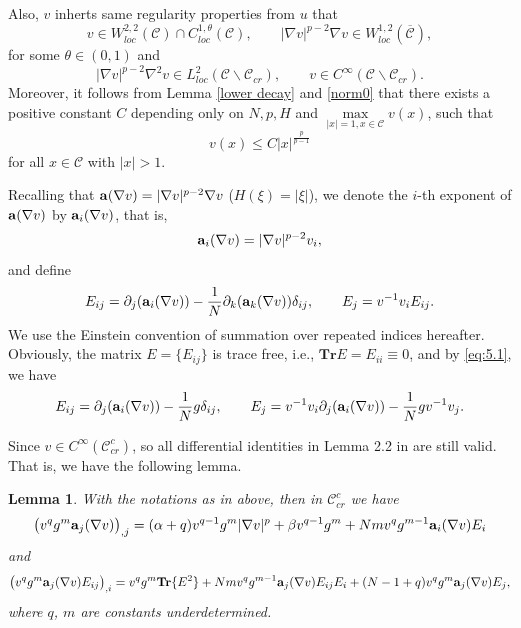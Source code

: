 \documentclass[12pt]{amsart}
\newtheorem{lem}[thm]{Lemma}
\theoremstyle{definition}
\theoremstyle{remark}
\theoremstyle{conclusion}
\theoremstyle{conjecture}
\numberwithin{equation}{section}
\begin{document}
Also, $v$ inherts same regularity properties from $u$ that
\begin{equation*}\label{eq:5.2}
  v\in W^{2,2}_{loc}(\mathcal{C})\cap C^{1,\theta}_{loc}(\mathcal{C}),\qquad|\nabla v|^{p-2}\nabla v\in W^{1,2}_{loc}(\overline{\mathcal{C}}),
\end{equation*}
for some $\theta\in(0,1)$ and
\begin{equation*}\label{eq:5.3}
 |\nabla v|^{p-2}\nabla^2v\in L^{2}_{loc}(\mathcal{C}\backslash\mathcal{C}_{cr}),\qquad v\in C^{\infty}(\mathcal{C}\backslash\mathcal{C}_{cr}).
\end{equation*}
Moreover, it follows from Lemma \ref{lower decay} and \eqref{norm0} that there exists a positive constant $C$ depending only on $N,p,H$ and  $\max\limits_{|x|=1,x\in\mathcal{C}}v(x)$, such that
\begin{equation}\label{eq5.4}
  v(x)\leq C|x|^{\frac{p}{p-1}}
\end{equation}
for all $x\in\mathcal{C}$ with $|x|>1$.


Recalling that ${\bf{a}}(\nabla v)=|\nabla v|^{p-2}\nabla v$ ($H(\xi)=|\xi|$),  we denote the $i$-th exponent of ${\bf{a}}(\nabla v)$ by ${\bf{a}}_i(\nabla v)$, that is,
$${\bf{a}}_i(\nabla v)=|\nabla v|^{p-2} v_i,$$
and define
$$E_{ij}=\partial_j({\bf{a}}_i(\nabla v))-\frac{1}{N}\partial_k({\bf{a}}_k(\nabla v))\delta_{ij},\qquad E_j=v^{-1}v_iE_{ij}.$$
We use the Einstein convention of summation over repeated indices hereafter. Obviously, the matrix $E=\{E_{ij}\}$ is trace free, i.e., $\textbf{Tr}E=E_{ii}\equiv 0$, and by \eqref{eq:5.1}, we have
$$E_{ij}=\partial_j({\bf{a}}_i(\nabla v))-\frac{1}{N}g\delta_{ij},\qquad E_j=v^{-1}v_i\partial_j({\bf{a}}_i(\nabla v))-\frac{1}{N}gv^{-1}v_j.$$

Since $v\in C^{\infty}(\mathcal{C}^c_{cr})$, so all differential identities in Lemma 2.2 in \cite{Ou} are still valid. That is, we have the following lemma.

\begin{lem}\cite[Lemma 2.2]{Ou}\label{lem5.2}
With the notations as in above, then in $\mathcal{C}^c_{cr}$ we have
\begin{equation}\label{eq5.6}
\big( v^{q}g^{m}{\bf{a}}_j(\nabla v)\big)_{,j}=(\alpha+q)v^{q-1}g^m|\nabla v|^p+\beta v^{q-1}g^{m}+Nmv^{q}g^{m-1}{\bf{a}}_i(\nabla v)E_i
\end{equation}
and
\begin{equation}\label{eq5.7}
\big( v^{q}g^{m}{\bf{a}}_j(\nabla v)E_{ij}\big)_{,i}= v^{q}g^m \mathbf{Tr}\{E^2\} +Nmv^{q}g^{m-1}{\bf{a}}_j(\nabla v)E_{ij}E_i +(N-1+q)v^{q}g^{m}{\bf{a}}_j(\nabla v)E_j,
\end{equation}
where $q$, $m$ are constants underdetermined.
\end{lem}
\end{document}
